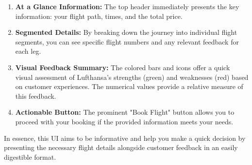 \documentclass[a4paper]{article}
\begin{document}
\begin{enumerate}
    \item \textbf{At a Glance Information:} The top header immediately presents the key information: your flight path, times, and the total price.
    \item \textbf{Segmented Details:} By breaking down the journey into individual flight segments, you can see specific flight numbers and any relevant feedback for each leg.
    \item \textbf{Visual Feedback Summary:} The colored bars and icons offer a quick visual assessment of Lufthansa's strengths (green) and weaknesses (red) based on customer experiences. The numerical values provide a relative measure of this feedback.
    \item \textbf{Actionable Button:} The prominent "Book Flight" button allows you to proceed with your booking if the provided information meets your needs.
\end{enumerate}

In essence, this UI aims to be informative and help you make a quick decision by presenting the necessary flight details alongside customer feedback in an easily digestible format.




\end{document}

